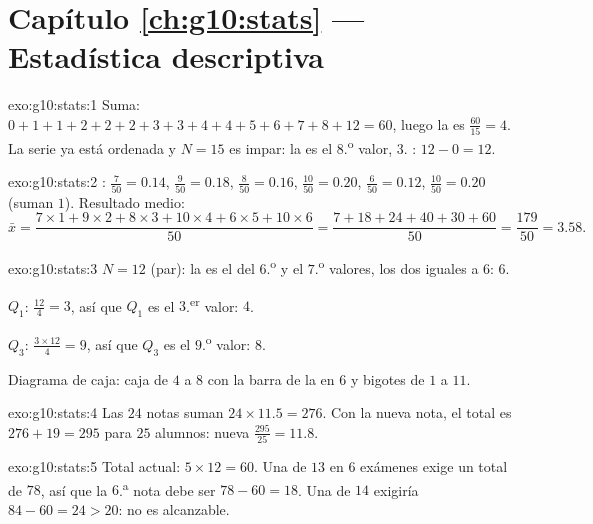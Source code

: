 \section*{Capítulo \ref{ch:g10:stats} --- Estadística descriptiva}

\begin{solution}{exo:g10:stats:1}
Suma: $0+1+1+2+2+2+3+3+4+4+5+6+7+8+12 = 60$, luego la  es
$\frac{60}{15} = 4$. La serie ya está ordenada y $N = 15$ es impar: la
 es el $8$.\textsuperscript{o} valor, $3$. :
$12 - 0 = 12$.
\end{solution}

\begin{solution}{exo:g10:stats:2}
: $\frac{7}{50} = 0.14$, $\frac{9}{50} = 0.18$,
$\frac{8}{50} = 0.16$, $\frac{10}{50} = 0.20$, $\frac{6}{50} = 0.12$,
$\frac{10}{50} = 0.20$ (suman $1$). Resultado medio:
\[
\bar x = \frac{7 \times 1 + 9 \times 2 + 8 \times 3 + 10 \times 4
+ 6 \times 5 + 10 \times 6}{50}
= \frac{7 + 18 + 24 + 40 + 30 + 60}{50}
= \frac{179}{50} = 3.58 .
\]
\end{solution}

\begin{solution}{exo:g10:stats:3}
$N = 12$ (par): la  es el  del $6$.\textsuperscript{o} y
el $7$.\textsuperscript{o} valores, los dos iguales a $6$:  $6$.

$Q_1$: $\frac{12}{4} = 3$, así que $Q_1$ es el $3$.\textsuperscript{er}
valor: $4$.

$Q_3$: $\frac{3 \times 12}{4} = 9$, así que $Q_3$ es el
$9$.\textsuperscript{o} valor: $8$.

Diagrama de caja: caja de $4$ a $8$ con la barra de la  en $6$ y
bigotes de $1$ a $11$.
\end{solution}

\begin{solution}{exo:g10:stats:4}
Las $24$ notas suman $24 \times 11.5 = 276$. Con la nueva nota, el total
es $276 + 19 = 295$ para $25$ alumnos: nueva 
$\frac{295}{25} = 11.8$.
\end{solution}

\begin{solution}{exo:g10:stats:5}
Total actual: $5 \times 12 = 60$. Una  de $13$ en $6$ exámenes exige
un total de $78$, así que la $6$.\textsuperscript{a} nota debe ser
$78 - 60 = 18$. Una  de $14$ exigiría $84 - 60 = 24 > 20$: no es
alcanzable.
\end{solution}

